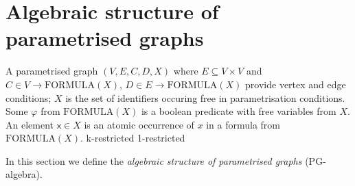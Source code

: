 \section{Algebraic structure of parametrised graphs\label{sec:Algebra-of-parametrised}}

A parametrised graph $(V, E, C, D, X)$
where $E \subseteq V \times V$ and $C \in V \rightarrow \mathrm{FORMULA}(X)$, $D \in E \rightarrow \mathrm{FORMULA}(X)$ provide vertex and edge conditions; $X$ is the set of identifiers occuring free in parametrisation conditions. Some $\varphi$ from $\mathrm{FORMULA}(X)$ is a boolean predicate with free variables from $X$. An element $\mathsf{x} \in X$ is an atomic occurrence of $x$ in a formula from $\mathrm{FORMULA}(X)$.  
k-restricted
1-restricted


In this section we define the \emph{algebraic structure of parametrised graphs}
(PG-algebra).

